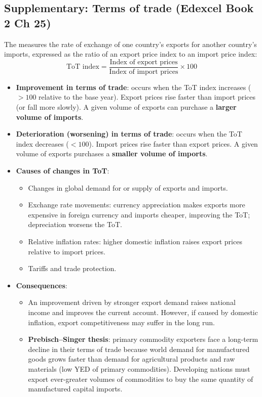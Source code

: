 \subsection{Supplementary: Terms of trade (Edexcel Book 2 Ch 25)}
The  measures the rate of exchange of one country's exports for another country's imports, expressed as the ratio of an export price index to an import price index:
\[\text{ToT index} = \dfrac{\text{Index of export prices}}{\text{Index of import prices}} \times 100\]
\begin{itemize}
  \item \textbf{Improvement in terms of trade}: occurs when the ToT index increases ($> 100$ relative to the base year). Export prices rise faster than import prices (or fall more slowly). A given volume of exports can purchase a \textbf{larger volume of imports}.
  \item \textbf{Deterioration (worsening) in terms of trade}: occurs when the ToT index decreases ($< 100$). Import prices rise faster than export prices. A given volume of exports purchases a \textbf{smaller volume of imports}.
  \item \textbf{Causes of changes in ToT}:
  \begin{itemize}
    \item Changes in global demand for or supply of exports and imports.
    \item Exchange rate movements: currency appreciation makes exports more expensive in foreign currency and imports cheaper, improving the ToT; depreciation worsens the ToT.
    \item Relative inflation rates: higher domestic inflation raises export prices relative to import prices.
    \item Tariffs and trade protection.
  \end{itemize}
  \item \textbf{Consequences}:
  \begin{itemize}
    \item An improvement driven by stronger export demand raises national income and improves the current account. However, if caused by domestic inflation, export competitiveness may suffer in the long run.
    \item \textbf{Prebisch--Singer thesis}: primary commodity exporters face a long-term decline in their terms of trade because world demand for manufactured goods grows faster than demand for agricultural products and raw materials (low YED of primary commodities). Developing nations must export ever-greater volumes of commodities to buy the same quantity of manufactured capital imports.

\end{itemize}
\end{itemize}
